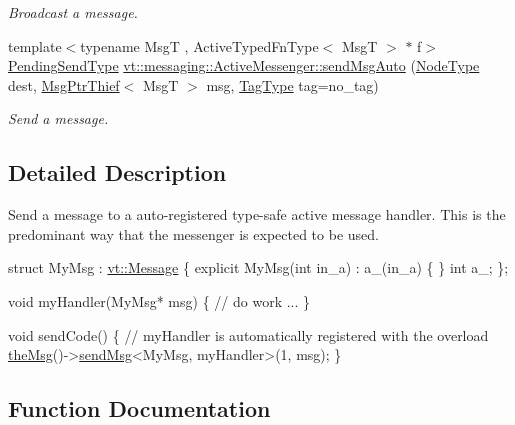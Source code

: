 \begin{DoxyCompactItemize}
\begin{DoxyCompactList}\small\item\em Broadcast a message. \end{DoxyCompactList}\item 
{\footnotesize template$<$typename MsgT , Active\+Typed\+Fn\+Type$<$ Msg\+T $>$ $\ast$ f$>$ }\\\hyperlink{structvt_1_1messaging_1_1_active_messenger_a3626a6ca76d8ad4ec7c3b47a2c70d3a8}{Pending\+Send\+Type} \hyperlink{group__typesafehan_ga9e67738f189123c256172ce9e22a8b68}{vt\+::messaging\+::\+Active\+Messenger\+::send\+Msg\+Auto} (\hyperlink{namespacevt_a866da9d0efc19c0a1ce79e9e492f47e2}{Node\+Type} dest, \hyperlink{structvt_1_1messaging_1_1_msg_ptr_thief}{Msg\+Ptr\+Thief}$<$ MsgT $>$ msg, \hyperlink{namespacevt_a84ab281dae04a52a4b243d6bf62d0e52}{Tag\+Type} tag=no\+\_\+tag)
\begin{DoxyCompactList}\small\item\em Send a message. \end{DoxyCompactList}\end{DoxyCompactItemize}


\subsection{Detailed Description}
Send a message to a auto-\/registered type-\/safe active message handler. This is the predominant way that the messenger is expected to be used. 


\begin{DoxyCode}
\textcolor{keyword}{struct }MyMsg : \hyperlink{structvt_1_1messaging_1_1_active_msg}{vt::Message} \{
  \textcolor{keyword}{explicit} MyMsg(\textcolor{keywordtype}{int} in\_a) : a\_(in\_a) \{ \}
  \textcolor{keywordtype}{int} a\_;
\};

\textcolor{keywordtype}{void} myHandler(MyMsg* msg) \{
  \textcolor{comment}{// do work ...}
\}

\textcolor{keywordtype}{void} sendCode() \{
  \textcolor{comment}{// myHandler is automatically registered with the overload}
  \hyperlink{namespacevt_aeafd31f866aeb4dc6fc2f6ee97136350}{theMsg}()->\hyperlink{group__preregister_ga0162a39473e7f9b490a79a7983d949ac}{sendMsg}<MyMsg, myHandler>(1, msg);
\}
\end{DoxyCode}
 

\subsection{Function Documentation}
\mbox{\label{group__typesafehan_ga058d20ece0e732645bc62d6a448abe76}} 
